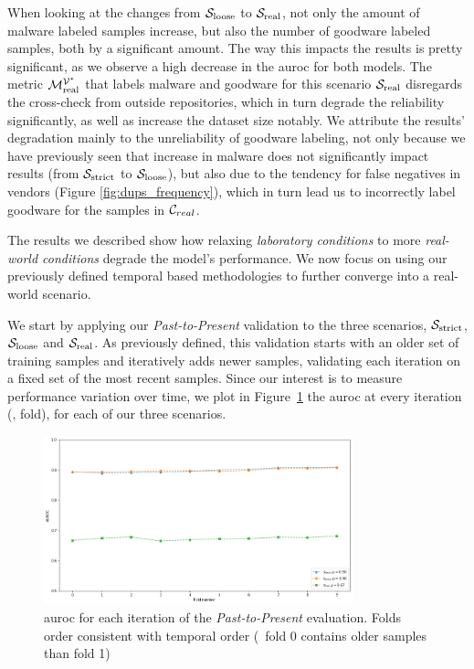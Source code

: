 When looking at the changes from $\mathcal{S}_{\mathrm{loose}}$ to $\mathcal{S}_{\mathrm{real}}$, not only the amount of malware labeled samples increase, but also the number of goodware labeled samples, both by a significant amount. 
The way this impacts the results is pretty significant, as we observe a high decrease in the \gls{auroc} for both models.
The metric $\mathcal{M}_{\mathrm{real}}^{\mathcal{V}^*}$ that labels malware and goodware for this scenario $\mathcal{S}_{\mathrm{real}}$ disregards the cross-check from outside repositories, which in turn degrade the reliability significantly, as well as increase the dataset size notably.
We attribute the results' degradation mainly to the unreliability of goodware labeling, not only because we have previously seen that increase in malware does not significantly impact results (from $\mathcal{S}_{\mathrm{strict}}$ to $\mathcal{S}_{\mathrm{loose}}$), but also due to the tendency for false negatives in vendors (Figure \ref{fig:dups_frequency}), which in turn lead us to incorrectly label goodware for the samples in $\mathcal{C}_{real}$.

The results we described show how relaxing \textit{laboratory conditions} to more \textit{real-world conditions} degrade the model's performance.
We now focus on using our previously defined temporal based methodologies to further converge into a real-world scenario.

\medskip

We start by applying our \textit{Past-to-Present} validation to the three scenarios, $\mathcal{S}_{\mathrm{strict}}$, $\mathcal{S}_{\mathrm{loose}}$ and $\mathcal{S}_{\mathrm{real}}$.
As previously defined, this validation starts with an older set of training samples and iteratively adds newer samples, validating each iteration on a fixed set of the most recent samples.
Since our interest is to measure performance variation over time, we plot in Figure~\ref{fig:pastpresent} the \gls{auroc} at every iteration (\ie, fold), for each of our three scenarios.

\begin{figure}[!htb]
	\centering
	\includegraphics[width=0.8\textwidth]{Figures/pastpresent.png}
	\caption[Single layer results for static features in \textit{Past-to-Present}.]{\gls{auroc} for each iteration of the \textit{Past-to-Present} evaluation. Folds order consistent with temporal order (\ie\ fold 0 contains older samples than
fold 1)}
	\label{fig:pastpresent}
\end{figure}

